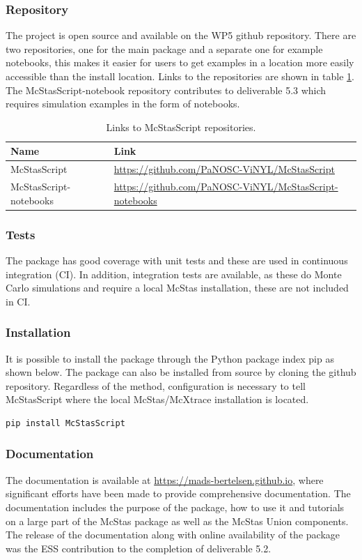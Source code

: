 \documentclass[11pt, a4paper]{article}
\begin{document}
\subsubsection{Repository}
The project is open source and available on the WP5 github repository. There are two repositories, one for the main package and a separate one for example notebooks, this makes it easier for users to get examples in a location more easily accessible than the install location. Links to the repositories are shown in table \ref{tab:links}. The McStasScript-notebook repository contributes to deliverable 5.3 which requires simulation examples in the form of notebooks.

\begin{table}[h!!!]
\centering
\begin{tabular}{l|l}
Name & Link \\\hline
McStasScript & \href{https://github.com/PaNOSC-ViNYL/McStasScript}{https://github.com/PaNOSC-ViNYL/McStasScript} \\
McStasScript-notebooks &  \href{https://github.com/PaNOSC-ViNYL/McStasScript-notebooks}{https://github.com/PaNOSC-ViNYL/McStasScript-notebooks}
\end{tabular}
\caption{\label{tab:links} Links to McStasScript repositories.}
\end{table}

\subsubsection{Tests}
The package has good coverage with unit tests and these are used in continuous integration (CI). In addition, integration tests are available, as these do Monte Carlo simulations and require a local McStas installation, these are not included in CI.

\subsubsection{Installation}
It is possible to install the package through the Python package index pip as shown below. The package can also be installed from source by cloning the github repository. Regardless of the method, configuration is necessary to tell McStasScript where the local McStas/McXtrace installation is located.

\begin{verbatim}
pip install McStasScript
\end{verbatim}

\subsubsection{Documentation}
The documentation is available at \href{https://mads-bertelsen.github.io}{https://mads-bertelsen.github.io}, where significant efforts have been made to provide comprehensive documentation. The documentation includes the purpose of the package, how to use it and tutorials on a large part of the McStas package as well as the McStas Union components. The release of the documentation along with online availability of the package was the ESS contribution to the completion of deliverable 5.2.
\end{document}
